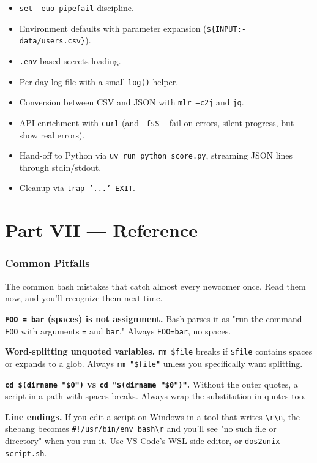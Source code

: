 \documentclass[11pt,a4paper]{article}
\begin{document}
\begin{itemize}[leftmargin=*]
\item \texttt{set -euo pipefail} discipline.
\item Environment defaults with parameter expansion
(\texttt{\$\{INPUT:-data/users.csv\}}).
\item \texttt{.env}-based secrets loading.
\item Per-day log file with a small \texttt{log()} helper.
\item Conversion between CSV and JSON with \texttt{mlr --c2j} and \texttt{jq}.
\item API enrichment with \texttt{curl} (and \texttt{-fsS} -- fail
on errors, silent progress, but show real errors).
\item Hand-off to Python via \texttt{uv run python score.py},
streaming JSON lines through stdin/stdout.
\item Cleanup via \texttt{trap '...' EXIT}.
\end{itemize}

\clearpage
\part*{Part VII --- Reference}

\section{Common Pitfalls}

The common bash mistakes that catch almost every newcomer once.
Read them now, and you'll recognize them next time.

\textbf{\texttt{FOO = bar} (spaces) is not assignment.} Bash parses
it as "run the command \texttt{FOO} with arguments \texttt{=} and
\texttt{bar}." Always \texttt{FOO=bar}, no spaces.

\textbf{Word-splitting unquoted variables.} \texttt{rm \$file}
breaks if \texttt{\$file} contains spaces or expands to a glob.
Always \texttt{rm "\$file"} unless you specifically want splitting.

\textbf{\texttt{cd \$(dirname "\$0")} vs \texttt{cd "\$(dirname
"\$0")"}.} Without the outer quotes, a script in a path with
spaces breaks. Always wrap the substitution in quotes too.

\textbf{Line endings.} If you edit a script on Windows in a tool
that writes \texttt{\textbackslash{}r\textbackslash{}n}, the shebang
becomes \texttt{\#!/usr/bin/env bash\textbackslash{}r} and you'll
see "no such file or directory" when you run it. Use VS Code's
WSL-side editor, or \texttt{dos2unix script.sh}.
\end{document}

